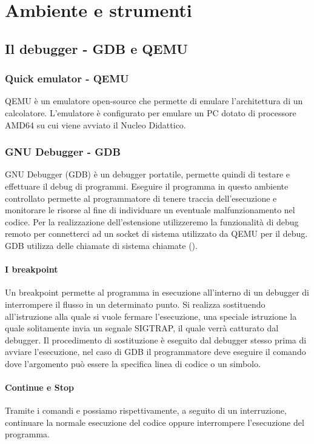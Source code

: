 \chapter{Ambiente e strumenti}
\section{Il debugger - GDB e QEMU}
\subsection{Quick emulator - QEMU}
QEMU è un emulatore open-source che permette di emulare l'architettura di un calcolatore. L'emulatore è configurato per emulare un PC dotato di processore AMD64 su cui viene avviato il Nucleo Didattico.

\subsection{GNU Debugger - GDB}
GNU Debugger (GDB) è un debugger portatile, permette quindi di testare e effettuare il debug di programmi. Eseguire il programma in questo ambiente controllato permette al programmatore di tenere traccia dell'esecuzione e monitorare le risorse al fine di individuare un eventuale malfunzionamento nel codice. Per la realizzazione dell'estensione utilizzeremo la funzionalità di debug remoto per connetterci ad un socket di sistema utilizzato da QEMU per il debug. GDB utilizza delle chiamate di sistema chiamate  (). 

\subsubsection{I breakpoint}
Un breakpoint permette al programma in esecuzione all'interno di un debugger di interrompere il flusso in un determinato punto. Si realizza sostituendo all'istruzione alla quale si vuole fermare l'esecuzione, una speciale istruzione la quale solitamente invia un segnale SIGTRAP, il quale verrà catturato dal debugger. Il procedimento di sostituzione è eseguito dal debugger stesso prima di avviare l'esecuzione, nel caso di GDB il programmatore deve eseguire il comando  dove l'argomento può essere la specifica linea di codice o un simbolo. 

\subsubsection{Continue e Stop}
Tramite i comandi  e  possiamo rispettivamente, a seguito di un interruzione, continuare la normale esecuzione del codice oppure interrompere l'esecuzione del programma.

